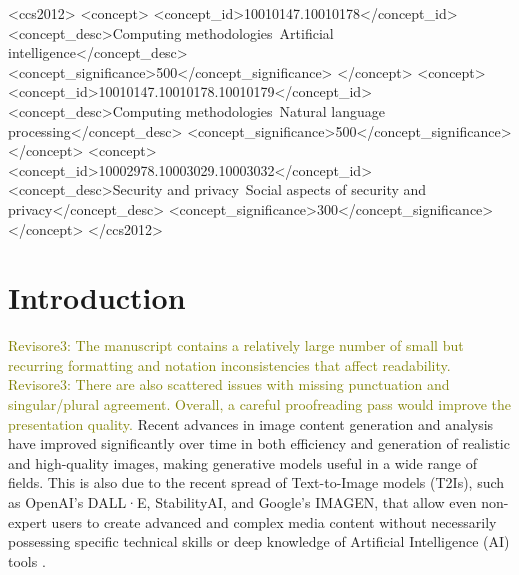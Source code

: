 \documentclass[acmsmall]{acmart}
\newcommand{\dalle}{DALL·E\xspace}
\newcommand{\imagen}{IMAGEN\xspace}
\newcommand{\revthree}[1]{\textcolor{olive}{Revisore3: #1}}
\begin{document}
\begin{CCSXML}
<ccs2012>
   <concept>
       <concept_id>10010147.10010178</concept_id>
       <concept_desc>Computing methodologies~Artificial intelligence</concept_desc>
       <concept_significance>500</concept_significance>
       </concept>
   <concept>
       <concept_id>10010147.10010178.10010179</concept_id>
       <concept_desc>Computing methodologies~Natural language processing</concept_desc>
       <concept_significance>500</concept_significance>
       </concept>
   <concept>
       <concept_id>10002978.10003029.10003032</concept_id>
       <concept_desc>Security and privacy~Social aspects of security and privacy</concept_desc>
       <concept_significance>300</concept_significance>
       </concept>
 </ccs2012>
\end{CCSXML}




\maketitle

\section{Introduction}\label{sec:introduction}
\revthree{The manuscript contains a relatively large number of small but recurring formatting and notation inconsistencies that affect readability. }
\revthree{There are also scattered issues with missing punctuation and singular/plural agreement. Overall, a careful proofreading pass would improve the presentation quality.}
Recent advances in image content generation and analysis have improved significantly over time in both efficiency and generation of realistic and high-quality images, making generative models useful in a wide range of fields. This is also due to the recent spread of Text-to-Image models (T2Is), such as OpenAI's \dalle, StabilityAI, and Google's \imagen, that allow even non-expert users to create advanced and complex media content without necessarily possessing specific technical skills or deep knowledge of Artificial Intelligence (AI) tools \cite{radford2021learning}. 
\end{document}
